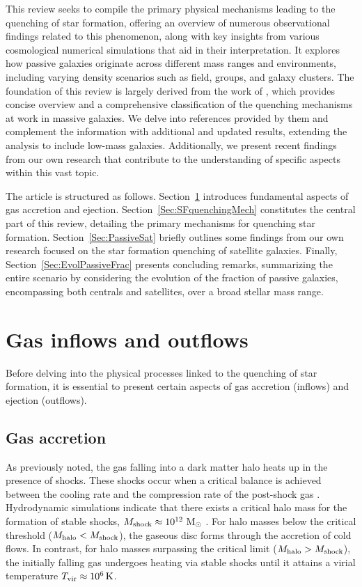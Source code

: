 \documentclass[baaa]{baaa}
\begin{document}
This review seeks to compile the primary physical mechanisms leading to the quenching of star formation, offering an overview of numerous observational findings related to this phenomenon, along with key insights from various cosmological numerical simulations that aid in their interpretation. It explores how passive galaxies originate across different mass ranges and environments, including varying density scenarios such as field, groups, and galaxy clusters. The foundation of this review is largely derived from the work of \cite{ManBelli_2018}, which provides concise overview and a
comprehensive classification of the
quenching mechanisms at work in massive galaxies. We delve into references provided by them and complement the information with additional and updated results, extending the analysis to include low-mass galaxies. Additionally, we present recent findings from our own research that contribute to the understanding of specific aspects within this vast topic.


The article is structured as follows. Section~\ref{Sec:InflowsOuflows} introduces fundamental aspects of gas accretion and ejection. Section~\ref{Sec:SFquenchingMech} constitutes the central part of this review, detailing the primary mechanisms for quenching star formation. Section~\ref{Sec:PassiveSat} briefly outlines some findings from our own research focused on the star formation quenching of satellite galaxies. Finally, Section~\ref{Sec:EvolPassiveFrac} presents concluding remarks, summarizing the entire scenario by considering the evolution of the fraction of passive galaxies, encompassing both centrals
and satellites, over a broad stellar mass range. 

\section{Gas inflows and outflows}
\label{Sec:InflowsOuflows}

Before delving into the physical processes linked to the quenching of star formation, it is essential to present certain aspects of gas accretion (inflows) and ejection (outflows). 

 
\subsection{Gas accretion}
\label{sec:GasAccretion}

As previously noted, the gas falling into a dark matter halo heats up in the presence of shocks. 
These shocks occur when a critical balance is achieved between the cooling rate and the compression rate of the post-shock gas \citep{BirnboimDekel_2003}. 
Hydrodynamic simulations indicate that there exists a critical halo mass
 for the formation of stable shocks, $M_{\rm shock} \approx 10^{12}~{\rm M}_{\odot}$ \citep{DekelBirnboim_2006}. 
For halo masses below the critical threshold ($M_{\rm halo} < M_{\rm shock}$), the gaseous disc forms through the accretion of cold flows. In contrast, for halo masses surpassing the critical limit ($M_{\rm halo} > M_{\rm shock}$), the initially falling gas undergoes heating via stable shocks until it attains a virial temperature $T_{\rm vir} \approx 10^6\,{\rm K}$.
\end{document}
